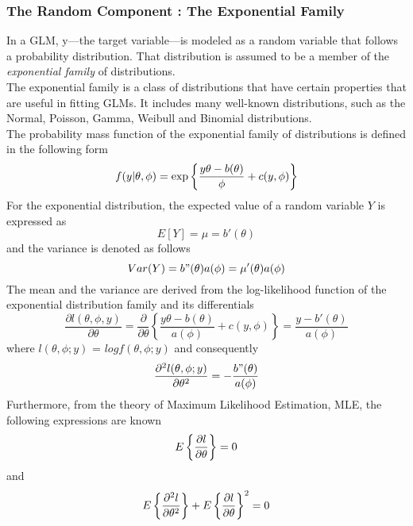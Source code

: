 \subsubsection{The Random Component : The Exponential Family}
In a GLM, y—the target variable—is modeled as a random variable that follows a probability distribution. That distribution is assumed to be a member of the \textit{exponential family} of distributions.\\
The exponential family is a class of distributions that have certain properties that are useful in fitting GLMs. It includes many well-known distributions, such as the Normal, Poisson, Gamma, Weibull and Binomial distributions.\\
The probability mass function of the exponential family of distributions is defined in the following form
\begin{equation}
	\centering
	f(y|\theta,\phi) = 
	\exp\left\{ \frac{y\theta-b(\theta)}{\phi} + c(y,\phi)\right\}
\end{equation}
For the exponential distribution, the expected value of a random variable $Y$ is 
expressed as
\begin{equation}
	E[Y]=\mu = b'(\theta)
\end{equation}
and the variance is denoted as follows
\begin{equation}
	Var(Y) = b"(\theta)a(\phi) = \mu'(\theta)a(\phi)
\end{equation}
The mean and the variance are derived from the log-likelihood function of the exponential distribution family and its differentials
\begin{equation}
	\frac{\partial l(\theta,\phi,y)}{\partial \theta} = \frac{\partial}{\partial \theta} \left\{\frac{y\theta - b(\theta)}{a(\phi)} + c(y,\phi)\right\} = \frac{y- b'(\theta)}{a(\phi)}
\end{equation}
where $l(\theta,\phi;y)$ = $log f(\theta,\phi;y)$ and consequently
\begin{equation}
	\frac{\partial^{2} l(\theta,\phi;y)}{\partial\theta^{2}} = -\frac{b"(\theta)}{a(\phi)}
\end{equation}
Furthermore, from the theory of Maximum Likelihood Estimation, MLE, the following expressions are known
\begin{equation}
	\centering
	E\left\{\frac{\partial l}{\partial \theta}\right\} = 0
\end{equation}
and
\begin{equation}
	\centering
	E\left\{\frac{\partial^{2} l}{\partial \theta^{2}}\right\} + 	E\left\{\frac{\partial l}{\partial \theta}\right\}^{2} = 0
\end{equation}
